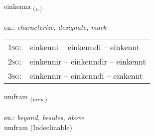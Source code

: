 \documentclass[frontgrid, backgrid]{flacards}\usepackage[]{graphicx}\usepackage[]{xcolor}
\begin{document}
\renewcommand{\flhead}{\vskip5pt \fboxsep=0pt {\small\bfseries\footnotesize Sagnorð | Verb}}
\renewcommand{\fcfoot}{\vskip5pt \fboxsep=0pt \hspace{2pt}{\small\bfseries\footnotesize 2K}}

\renewcommand{\blhead}{\vskip5pt {\small\bfseries\footnotesize Sagnorð | Verb }}
\renewcommand{\bcfoot}{\vskip5pt \hspace{2pt}{\small\bfseries\footnotesize 2K}}


{einkenna \small{\textsubscript{(\textit{v.})}} \\[1ex] %
\textphonetic{[eiɲcʰɛna]} \\
en.: \emph{characterize, designate, mark} \\  [2ex]
\renewcommand*{\arraystretch}{0.8}
\begin{tabular}{p{1cm}l}
\textsc{1sg}: & einkenni -- einkenndi -- einkennt \\ 
\textsc{2sg}: & einkennir -- einkenndir -- einkennt \\ 
\textsc{3sg}: & einkennir -- einkenndi -- einkennt \\ 
\end{tabular}
}


\renewcommand{\flhead}{\vskip5pt \fboxsep=0pt {\small\bfseries\footnotesize Forsetning | Preposition}}
\renewcommand{\fcfoot}{\vskip5pt \fboxsep=0pt \hspace{2pt}{\small\bfseries\footnotesize 2K}}

\renewcommand{\blhead}{\vskip5pt {\small\bfseries\footnotesize Forsetning | Preposition }}
\renewcommand{\bcfoot}{\vskip5pt \hspace{2pt}{\small\bfseries\footnotesize 2K}}


{umfram \small{\textsubscript{(\textit{prep.})}} \\[1ex]
\textphonetic{[ʏmfram]} \\
en.: \emph{beyond, besides, above} \\  [2ex]
umfram (Indeclinable)}
\end{document}
